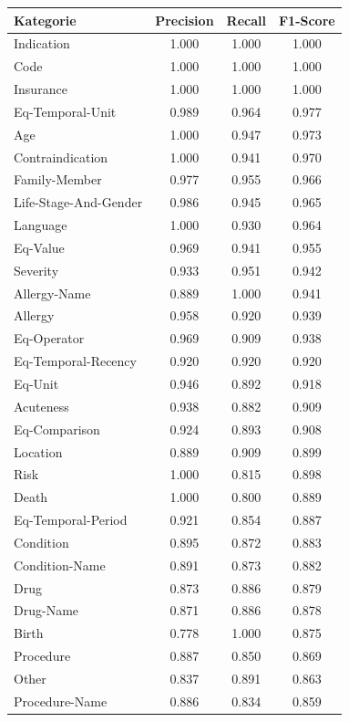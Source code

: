 \begin{table}[htbp]
\centering
\begin{tabular}{p{5cm}ccc}
\toprule
\textbf{Kategorie} & \textbf{Precision} & \textbf{Recall} & \textbf{F1-Score} \\
\midrule
Indication & 1.000 & 1.000 & 1.000 \\
Code & 1.000 & 1.000 & 1.000 \\
Insurance & 1.000 & 1.000 & 1.000 \\
Eq-Temporal-Unit & 0.989 & 0.964 & 0.977 \\
Age & 1.000 & 0.947 & 0.973 \\
Contraindication & 1.000 & 0.941 & 0.970 \\
Family-Member & 0.977 & 0.955 & 0.966 \\
Life-Stage-And-Gender & 0.986 & 0.945 & 0.965 \\
Language & 1.000 & 0.930 & 0.964 \\
Eq-Value & 0.969 & 0.941 & 0.955 \\
Severity & 0.933 & 0.951 & 0.942 \\
Allergy-Name & 0.889 & 1.000 & 0.941 \\
Allergy & 0.958 & 0.920 & 0.939 \\
Eq-Operator & 0.969 & 0.909 & 0.938 \\
Eq-Temporal-Recency & 0.920 & 0.920 & 0.920 \\
Eq-Unit & 0.946 & 0.892 & 0.918 \\
Acuteness & 0.938 & 0.882 & 0.909 \\
Eq-Comparison & 0.924 & 0.893 & 0.908 \\
Location & 0.889 & 0.909 & 0.899 \\
Risk & 1.000 & 0.815 & 0.898 \\
Death & 1.000 & 0.800 & 0.889 \\
Eq-Temporal-Period & 0.921 & 0.854 & 0.887 \\
Condition & 0.895 & 0.872 & 0.883 \\
Condition-Name & 0.891 & 0.873 & 0.882 \\
Drug & 0.873 & 0.886 & 0.879 \\
Drug-Name & 0.871 & 0.886 & 0.878 \\
Birth & 0.778 & 1.000 & 0.875 \\
Procedure & 0.887 & 0.850 & 0.869 \\
Other & 0.837 & 0.891 & 0.863 \\
Procedure-Name & 0.886 & 0.834 & 0.859 \\

\end{tabular}
\end{table}

